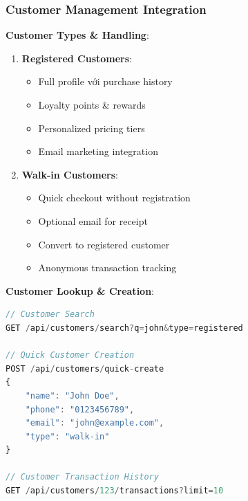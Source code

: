 \documentclass[12pt,a4paper]{article}
\begin{document}
\subsubsection{Customer Management Integration}
\textbf{Customer Types \& Handling}:
\begin{enumerate}
    \item \textbf{Registered Customers}:
       \begin{itemize}
           \item Full profile với purchase history
           \item Loyalty points \& rewards
           \item Personalized pricing tiers
           \item Email marketing integration
       \end{itemize}
    
    \item \textbf{Walk-in Customers}:
       \begin{itemize}
           \item Quick checkout without registration
           \item Optional email for receipt
           \item Convert to registered customer
           \item Anonymous transaction tracking
       \end{itemize}
\end{enumerate}

\textbf{Customer Lookup \& Creation}:
\begin{lstlisting}[language=javascript, caption=Customer Management API]
// Customer Search
GET /api/customers/search?q=john&type=registered

// Quick Customer Creation
POST /api/customers/quick-create
{
    "name": "John Doe",
    "phone": "0123456789", 
    "email": "john@example.com",
    "type": "walk-in"
}

// Customer Transaction History
GET /api/customers/123/transactions?limit=10
\end{lstlisting}
\end{document}
